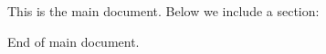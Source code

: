 \documentclass{article}
\begin{document}
This is the main document.
Below we include a section:



End of main document.
\end{document}
